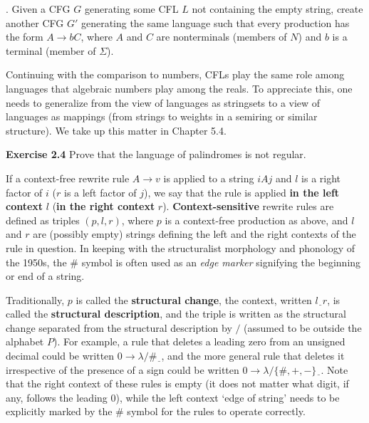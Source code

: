 {\smallskip{}. Given a CFG $G$ generating some CFL
$L$ not containing the empty string, create another CFG $G'$ generating the
same language such that every production has the form $A \rightarrow b C$, 
where $A$ and $C$ are nonterminals (members of $N$) and $b$ is a terminal 
(member of $\Sigma$).

Continuing with the comparison to numbers, CFLs play the same role among
languages that algebraic numbers play among the reals.
To appreciate this, one needs to
generalize from the view of languages as stringsets to a view of languages as
mappings (from strings to weights in a semiring or similar structure). We
take up this matter in Chapter 5.4. 

\smallskip\noindent
{\bf Exercise 2.4} Prove that the language of palindromes is not regular.

\smallskip\noindent 
If a context-free rewrite rule $A \rightarrow v$ is applied to a string $iAj$
and $l$ is a right factor of $i$ ($r$ is a left factor of $j$), we say that
the rule is applied {\bf in the left context} $l$ ({\bf in the right context}
$r$).  {\bf Context-sensitive} rewrite rules are defined as triples $(p, l,
r)$, where $p$ is a context-free production as above, and $l$ and $r$ are
(possibly empty) strings defining the left and the right contexts of the rule
in question.  In keeping with the structuralist morphology and phonology of
the 1950s, the $\#$ symbol is often used as an {\it edge marker} signifying
the beginning or end of a string. 

Traditionally, $p$ is called the {\bf structural change}, the context, written
$l\underline{\ \ }r$, is called the {\bf structural description}, and the
triple is written as the structural change separated from the structural
description by $/$ (assumed to be outside the alphabet $P$).
For example, a rule that deletes a leading zero from an unsigned decimal could
be written $0 \rightarrow \lambda /\#\underline{\ \ }$, and the more general
rule that deletes it irrespective of the presence of a sign could be written
$0 \rightarrow \lambda /\{\#,+,-\}\underline{\ \ }$. Note that the right
context of these rules is empty (it does not matter what digit, if any,
follows the leading 0), while the left context `edge of string' needs to be
explicitly marked by the \# symbol for the rules to operate correctly. 

}
